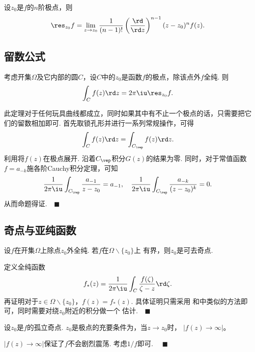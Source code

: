   \begin{thm}[留数的计算]
    设$z_0$是$f$的$n$阶极点，则
    \[
      \res_{z_0}f = \lim_{z\to z_0}\frac{1}{(n-1)!}
      \left(\frac{\rd}{\rd z}\right)^{n-1}(z-z_0)^nf(z).
    \]
  \end{thm}


\subsection{留数公式}
  \begin{thm}[留数公式]
    考虑开集$\Omega$及它内部的圆$C$，设$C$中的$z_0$是函数$f$的极点，除该点外$f$全纯. 则
    \begin{equation}
      \label{equ: 留数公式}
      \int_C f(z)\rd z = 2\pi\iu\res_{z_0}f.
    \end{equation}
  \end{thm}
  \remark
    此定理对于任何玩具曲线都成立，同时如果其中有不止一个极点的话，只需要把它们的留数相加即可.
  \proof
    首先取锁孔形并进行一系列常规操作，可得
    \[
      \int_{C}f(z)\rd z = \int_{C_\vep} f(z)\rd z.
    \]
    利用将$f(z)$在极点展开. 沿着$C_\vep$积分$G(z)$的结果为零.
    同时，对于常值函数$f=a_{-k}$施各阶Cauchy积分定理，可知
    \[
      \frac{1}{2\pi\iu}\int_{C_\vep}\frac{a_{-1}}{z-z_0}=a_{-1},\quad
      \frac{1}{2\pi\iu}\int_{C_\vep}\frac{a_{-k}}{(z-z_0)^k}=0.
    \]
    从而命题得证.$\quad\blacksquare$

  


\subsection{奇点与亚纯函数}

  \begin{thm}[Riemann]
    \label{thm: Riemann、可去奇点}
    设$f$在开集$\Omega$上除点$z_0$外全纯. 若$f$在$\Omega\backslash\{z_0\}$上
    有界，则$z_0$是可去奇点.
  \end{thm}
  \proof
    定义全纯函数
    \[
      f_*(z) = \frac{1}{2\pi\iu}\int_C\frac{f(\zeta)}{\zeta-z}\rd\zeta.
    \]
    再证明对于$z\in\Omega\backslash\{z_0\}$，$f(z)=f_*(z)$. 具体证明只需采用
    和中类似的方法即可，同时需要对绕$z_0$附近的积分做一个
    估计.$\quad\blacksquare$

  \begin{cor}
    设$z_0$是$f$的孤立奇点. $z_0$是极点的充要条件为，当$z\to z_0$时，
    $|f(z)\to\infty|$。
  \end{cor}
  \remark
    $|f(z)\to\infty|$保证了$f$不会剧烈震荡.
  \proof
    考虑$1/f$即可. $\quad\blacksquare$

